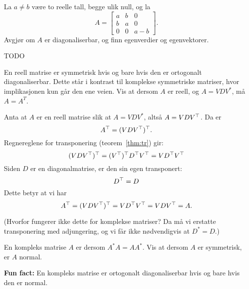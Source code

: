 \begin{oppgave}
La $ a\neq b$ være to reelle tall, begge ulik null, og la
$$A=
\begin{bmatrix}
a & b & 0\\
b & a & 0\\
0 & 0 & a-b
\end{bmatrix}.$$
Avgjør om $A$ er diagonaliserbar, og finn egenverdier og egenvektorer.
\end{oppgave}


\begin{losning}
TODO
\end{losning}



\begin{oppgave}
En reell matrise er symmetrisk hvis og bare hvis den er ortogonalt diagonaliserbar. 
Dette står i kontrast til komplekse symmetriske matriser, hvor implikasjonen kun går den ene veien. 
Vis at dersom $A$ er reell, og $A=VDV^*$, må $A=A^T$.
\end{oppgave}


\begin{losning}
Anta at $A$ er en reell matrise slik at $A = VDV^*$, altså $A = VDV^\top$.
Da er
\[
A^\top = (VDV^\top)^\top.
\]
Regnereglene for transponering (teorem~\ref{thm:tr}) gir:
\[
(VDV^\top)^\top = (V^\top)^\top D^\top V^\top = V D^\top V^\top
\]
Siden $D$ er en diagonalmatrise, er den sin egen transponert:
\[
D^\top = D
\]
Dette betyr at vi har
\[
A^\top = (VDV^\top)^\top = V D^\top V^\top = VDV^\top = A.
\]

(Hvorfor fungerer ikke dette for komplekse matriser?  Da må vi
erstatte transponering med adjungering, og vi får ikke nødvendigvis at
$D^* = D$.)
\end{losning}


\begin{oppgave}
En kompleks matrise $A$ er  dersom $A^*A=AA^*$. 
Vis at dersom $A$ er symmetrisk, er $A$ normal. 

\textbf{Fun fact:} En kompleks matrise er ortogonalt diagonaliserbar hvis og bare hvis den er normal.
\end{oppgave}


